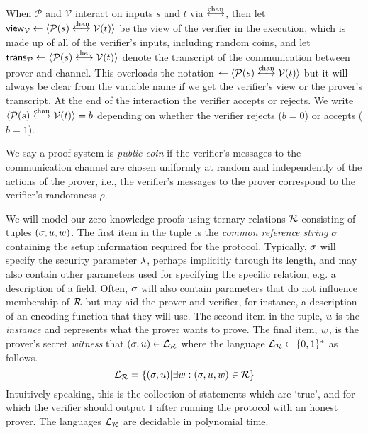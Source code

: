 When $\mathcal{P}$ and $\mathcal{V}$ interact on inputs $s$ and $t$ via $\overset{\textnormal{chan}}{\longleftrightarrow}$, then let $\mathsf{view}_{\mathcal{V}} \leftarrow \langle \mathcal{P}(s) \overset{\textnormal{chan}}{\longleftrightarrow} \mathcal{V}(t)\rangle$ be the view of the verifier in the execution, which is made up of all of the verifier's inputs, including random coins, and let $\mathsf{trans}_{\mathcal{P}} \leftarrow  \langle \mathcal{P}(s) \overset{\textnormal{chan}}{\longleftrightarrow} \mathcal{V}(t)\rangle$ denote the transcript of the communication between prover and channel. This overloads the notation $\leftarrow  \langle \mathcal{P}(s) \overset{\textnormal{chan}}{\longleftrightarrow} \mathcal{V}(t)\rangle$ but it will always be clear from the variable name if we get the verifier's view or the prover's transcript. At the end of the interaction the verifier accepts or rejects. We write $\langle \mathcal{P}(s)\overset{\textnormal{chan}}{\longleftrightarrow} \mathcal{V}(t)\rangle =b$ depending on whether the verifier rejects ($b=0$) or accepts ($b=1$).

We say a proof system is \emph{public coin} if the verifier's messages to the communication channel are chosen uniformly at random and independently of the actions of the prover, i.e., the verifier's messages to the prover correspond to the verifier's randomness $\rho$.

We will model our zero-knowledge proofs using ternary relations $\mathcal{R}$ consisting of tuples $(\mathsf{\sigma}, u,w)$. The first item in the tuple is the \emph{common reference string} $\mathsf{\sigma}$ containing the setup information required for the protocol. Typically, $\mathsf{\sigma}$ will specify the security parameter $\lambda$, perhaps implicitly through its length, and may also contain other parameters used for specifying the specific relation, e.g. a description of a field. Often, $\mathsf{\sigma}$ will also contain parameters that do not influence membership of $\mathcal{R}$ but may aid the prover and verifier, for instance, a description of an encoding function that they will use. The second item in the tuple, $u$ is the \emph{instance} and represents what the prover wants to prove. The final item, $w$, is the prover's secret \emph{witness} that $(\mathsf{\sigma},u)\in\mathcal{L}_{\mathcal{R}}$ where the language $\mathcal{L}_{\mathcal{R}} \subset \{0,1\}^*$ as follows.
\[ \mathcal{L}_{\mathcal{R}}=\{(\mathsf{\sigma},u)|\exists w: (\mathsf{\sigma},u,w)\in \mathcal{R}\} \]
Intuitively speaking, this is the collection of statements which are `true', and for which the verifier should output $1$ after running the protocol with an honest prover. The languages $\mathcal{L}_{\mathcal{R}}$ are decidable in polynomial time.


